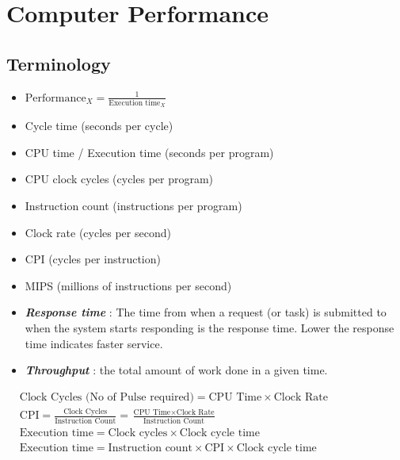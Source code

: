 \chapter{Computer Performance}

\section{Terminology}
\begin{itemize}[parsep=0.5em]
   \item $\text{Performance}_X = \frac{1}{\text{Execution time}_X}$
   \item Cycle time (seconds per cycle)
   \item CPU time / Execution time (seconds per program)
   \item CPU clock cycles (cycles per program)
   \item Instruction count (instructions per program)
   \item Clock rate (cycles per second)
   \item CPI (cycles per instruction)
   \item MIPS (millions of instructions per second)
\end{itemize}


\begin{itemize}
   \item \textbf{\textit{Response time}}
   : The time from when a request (or task) is submitted to when the system starts responding is the response time. Lower the response time indicates faster service.

   \item \textbf{\textit{Throughput}}
   : the total amount of work done in a given time.
\end{itemize}

\vspace{2em}
$\begin{aligned}
   & \text{Clock Cycles (No of Pulse required)} = \text{CPU Time} \times \text{Clock Rate} \\[0.5em]
   & \text{CPI} = \frac{\text{Clock Cycles}}{\text{Instruction Count}} = \frac{\text{CPU Time} \times \text{Clock Rate}}{\text{Instruction Count}} \\[0.5em]
   & \text{Execution time} = \text{Clock cycles} \times \text{Clock cycle time} \\[0.5em]
   & \text{Execution time} = \text{Instruction count} \times \text{CPI} \times \text{Clock cycle time}
\end{aligned}$




